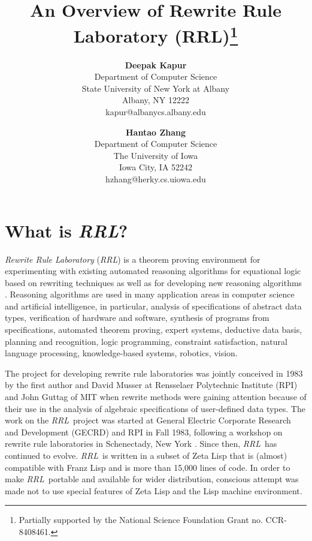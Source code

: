 \parskip 5pt
\topmargin -0.3in
\textheight 9in
\textwidth 6.2in
\oddsidemargin=0.2in
\evensidemargin=0.2in
\newcommand{\Grobner}{Gr\"{o}bner\ }
\newcommand{\Groebner}{Gr\"{o}bner\ }
\newcommand{\RRL}{{\sl RRL}\ }
\newcommand{\ERRL}{{\sl RRL}}
\pagestyle{empty}

\title{An Overview of Rewrite Rule Laboratory (RRL)\thanks
{Partially supported by the National Science Foundation Grant
no. CCR-8408461.}}
\author{{\bf Deepak Kapur} \\
Department of Computer Science \\
State University of New York at Albany \\
Albany, NY 12222 \\
kapur@albanycs.albany.edu \\
\and
{\bf Hantao Zhang} \\
Department of Computer Science \\
The University of Iowa \\
Iowa City, IA 52242 \\
hzhang@herky.cs.uiowa.edu}

\date{}
\maketitle

\section{What is \ERRL?}

{\sl Rewrite Rule Laboratory} (\ERRL) is a theorem proving environment
for experimenting with existing automated reasoning algorithms for
equational logic based on rewriting techniques as well as for
developing new reasoning algorithms
\cite{KapurSiva,KZ87,KZ881}.  Reasoning
algorithms are used in many application areas in computer science and
artificial intelligence, in particular, analysis of specifications of
abstract data types, verification of hardware and software, synthesis
of programs from specifications, automated theorem proving, expert
systems, deductive data basis, planning and recognition, logic
programming, constraint satisfaction, natural language processing,
knowledge-based systems, robotics, vision.  

The project for developing rewrite rule laboratories was jointly
conceived in 1983 by the first author and David Musser at Rensselaer
Polytechnic Institute (RPI) and John Guttag of MIT when rewrite
methods were gaining attention because of their use in the analysis of
algebraic specifications of user-defined data types.  The work on the
\RRL project was started at General Electric Corporate Research and
Development (GECRD) and RPI in Fall 1983, following a workshop on
rewrite rule laboratories in Schenectady, New York
\cite{Guttagetal84}.  Since then, \RRL has continued to evolve.
\RRL is written in a subset of Zeta Lisp that is (almost) compatible
with Franz Lisp and is more than 15,000 lines of code.  In order to
make \RRL portable and available for wider distribution, conscious
attempt was made not to use special features of Zeta Lisp and the Lisp
machine environment.
 
